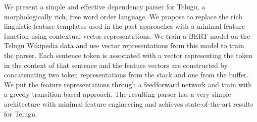We present a simple and effective dependency parser for Telugu, a morphologically rich, free word order language.  We propose to replace the  rich  linguistic  feature  templates  used  in the  past  approaches  with  a  minimal  feature function  using  contextual  vector  representations.  We train a BERT model on the Telugu Wikipedia data and use vector representations from this model to train the parser.  Each sentence token is associated with a vector representing  the  token  in  the  context  of  that  sentence and the feature vectors are constructed by  concatenating  two  token  representations from  the  stack  and one from the buffer. We put the feature representations through a feedforward network and train with a greedy transition based approach. The resulting parser has a  very  simple  architecture  with  minimal feature engineering and achieves state-of-the-art results for Telugu.
